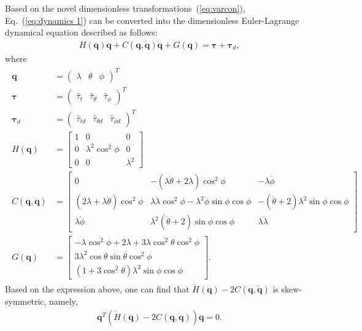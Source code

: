 \documentclass[3p]{elsarticle}
\theoremstyle{plain}
\theoremstyle{remark}
\begin{document}
Based on the novel dimensionless transformations~(\ref{eq:varcon}), Eq.~(\ref{eq:dynamics 1}) can be converted into the dimensionless Euler-Lagrange dynamical equation described as follows:
\begin{align}
H(\bm q)\ddot {\bm q}+C(\bm q,\dot{\bm q})\dot{\bm q}+G(\bm q) = \bm\tau+\bm\tau_d,\label{eq:dynamic model}
\end{align}
where
\begin{align}
\begin{split}
\bm q&= \begin{pmatrix}\lambda&\theta&\phi\end{pmatrix}^T\\
\bm \tau&=\begin{pmatrix}\hat\tau_t&\hat\tau_\theta&\hat\tau_\phi\end{pmatrix}^T\\
\bm\tau_d&=\begin{pmatrix}\hat\tau_{td}&\hat\tau_{\theta d}&\hat\tau_{\phi d}\end{pmatrix}^T\\
H(\bm q) &= \begin{bmatrix}1 &0&0\\0 &\lambda^2\cos^2\phi&0\\0&0&\lambda^2\end{bmatrix}\\
C(\bm q,\dot{\bm q}) &=\begin{bmatrix}0 &-(\lambda\dot \theta+2\lambda)\cos^2\phi&-\lambda\dot\phi\\(2\lambda+\lambda\dot \theta)\cos^2\phi&\lambda\dot \lambda\cos^2\phi-\lambda^2\dot\phi\sin\phi\cos\phi&-(\dot\theta+2)\lambda^2\sin\phi\cos\phi\\ \lambda\dot\phi&\lambda^2(\dot\theta+2)\sin\phi\cos\phi&\lambda\dot \lambda\end{bmatrix}\\
G(\bm q) &=\begin{bmatrix}-\lambda\cos^2\phi+2\lambda+3\lambda\cos ^2\theta\cos^2\phi\\3\lambda^2\cos\theta\sin\theta\cos^2\phi\\(1+3\cos^2\theta)\lambda^2\sin\phi\cos\phi\end{bmatrix}.
\end{split}
\end{align}
Based on the expression above, one can find that $\dot H(\bm q) - 2C(\bm q,\dot{\bm q})$ is skew-symmetric, namely,
\begin{align}
\bm q^T(\dot H(\bm q) - 2C(\bm q,\dot{\bm q}))\bm q = 0.
\end{align}
\end{document}
